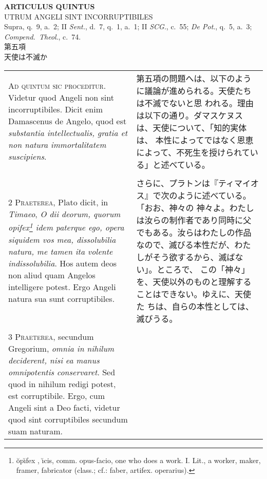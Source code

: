 \documentclass[10pt]{jsarticle} %
\begin{document}
\newpage

\begin{center}
 {\Large {\bf ARTICULUS QUINTUS}}\\
 {\large UTRUM ANGELI SINT INCORRUPTIBILES}\\
 {\footnotesize Supra, q.~9, a.~2; II {\itshape Sent.}, d.~7, q.~1,
 a.~1; II {\itshape SCG}., c.~55; {\itshape De Pot}., q.~5, a.~3;
 {\itshape Compend.~Theol}., c.~74.}\\
 {\Large 第五項\\天使は不滅か}
\end{center}

\begin{longtable}{p{21em}p{21em}}

{\huge A}{\scshape d quintum sic proceditur}. Videtur quod
Angeli non sint incorruptibiles. Dicit enim Damascenus de Angelo, quod
est {\itshape substantia intellectualis, gratia et non natura immortalitatem
suscipiens}.


&

第五項の問題へは、以下のように議論が進められる。天使たちは不滅でないと思
 われる。理由は以下の通り。ダマスケヌスは、天使について、「知的実体は、
 本性によってではなく恩恵によって、不死生を授けられている」と述べている。

\\\\


{\scshape 2 Praeterea}, Plato dicit, in {\itshape Timaeo}, {\itshape O
dii deorum, quorum opifex\footnote{ \u{o}p\u{\i}fex , \u{\i}cis,
comm. opus-facio, one who does a work.  I. Lit., a worker, maker,
framer, fabricator (class.; cf.: faber, artifex. operarius).  } idem
paterque ego, opera siquidem vos mea, dissolubilia natura, me tamen ita
volente indissolubilia}. Hos autem deos non aliud quam Angelos
intelligere potest. Ergo Angeli natura sua sunt corruptibiles.

&

さらに、プラトンは『ティマイオス』で次のように述べている。「おお、神々の
 神々よ。わたしは汝らの制作者であり同時に父でもある。汝らはわたしの作品
 なので、滅びる本性だが、わたしがそう欲するから、滅ばない」。ところで、
 この「神々」を、天使以外のものと理解することはできない。ゆえに、天使た
 ちは、自らの本性としては、滅びうる。

\\\\


{\scshape 3 Praeterea}, secundum Gregorium, {\itshape omnia in
nihilum deciderent, nisi ea manus omnipotentis conservaret}. Sed quod in
nihilum redigi potest, est corruptibile. Ergo, cum Angeli sint a Deo
facti, videtur quod sint corruptibiles secundum suam naturam.



\end{longtable}
\end{document}
